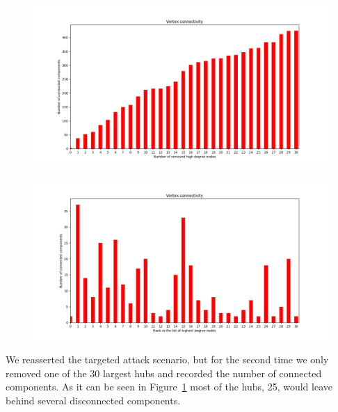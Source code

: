 \documentclass[a4paper]{article}
\theoremstyle{definition}
\begin{document}
\begin{figure}[h]
	\centering
	\begin{minipage}{.6\textwidth}
		\centering
		\includegraphics[width=\linewidth]{vertexConnectivity.png}
		\label{fig:vertexconnectivity}
	\end{minipage}%
	\begin{minipage}{.6\textwidth}
		\centering
		\includegraphics[width=\linewidth]{vertexConnectivity1Removed.png}
		\label{fig:vertecconnectivity1removed}
	\end{minipage}
\end{figure}

We reasserted the targeted attack scenario, but for the second time we only removed one of the $30$ largest hubs and recorded the number of connected components. As it can be seen in Figure~\ref{fig:vertecconnectivity1removed} most of the hubs, 25, would leave behind several disconnected components.
\end{document}

